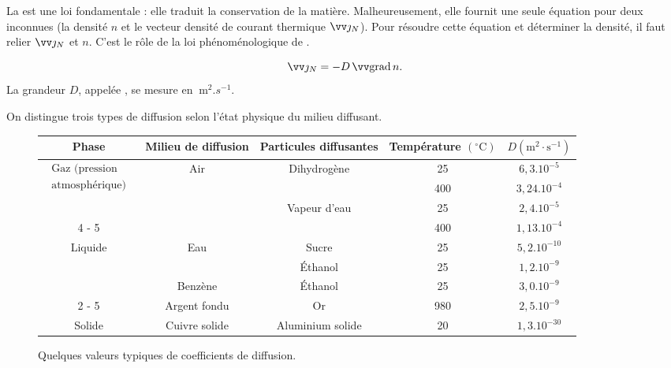 \documentclass[12pt,fancy]{cours}
\begin{document}
La  est une loi fondamentale : elle traduit la conservation de la matière. Malheureusement, elle fournit une seule équation pour deux inconnues (la densité $n$ et le vecteur densité de courant thermique $\Vec{\jN}$). Pour résoudre cette équation et déterminer la densité, il faut relier $\Vec{\jN}$ et $n$. C'est le rôle de la loi phénoménologique de .

\begin{theorem}\label{form:fick}
\begin{equation*}
\Vec{\jN}=-D\,\Grad{n}.
\end{equation*}
La grandeur $D$, appelée , se mesure en $\SI{}{\meter^2.s^{-1}}$.
\end{theorem}
\noindent  On distingue trois types de diffusion selon l’état physique du milieu diffusant.
\begin{figure}[H]
\centering

\begin{tabular}{|c|c|c|c|c|}
\hline Phase & Milieu de diffusion & Particules diffusantes & Température $\left({ }^{\circ} \mathrm{C}\right)$ & $D\left(\mathrm{m}^2 \cdot \mathrm{s}^{-1}\right)$ \\
\hline \multirow{3}{*}{$\begin{array}{c}\text { Gaz (pression } \\
\text { atmosphérique) }\end{array}$} & \multirow{3}{*}{ Air } & \multirow{2}{*}{ Dihydrogène } & 25 & $6,3.10^{-5}$ \\
\cline { 4 - 5 } & & & 400 & $3,24.10^{-4}$ \\
\cline { 3 - 5 } & & \multirow{2}{*}{ Vapeur d'eau } & 25 & $2,4.10^{-5}$ \\
\cline { 4 - 5 } & & & 400 & $1,13.10^{-4}$ \\
\hline \multirow{3}{*}{ Liquide } & \multirow{2}{*}{ Eau } & Sucre & 25 & $5,2.10^{-10}$ \\
\cline { 3 - 5 } & & Éthanol & 25 & $1,2.10^{-9}$ \\
\cline { 2 - 5 } & Benzène & Éthanol & 25 & $3,0.10^{-9}$ \\
\cline { 2 - 5 } & Argent fondu & Or & 980 & $2,5.10^{-9}$ \\
\hline Solide & Cuivre solide & Aluminium solide & 20 & $1,3.10^{-30}$ \\
\hline
\end{tabular}
\caption{Quelques valeurs typiques de coefficients de diffusion.
}
\end{figure}
\end{document}
